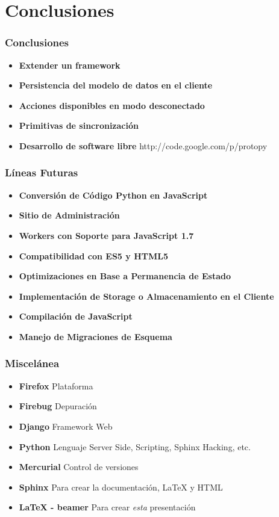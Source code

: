 \documentclass{beamer}
\begin{document}
\section{Conclusiones}
\begin{frame}
    \frametitle{Conclusiones}
    \begin{itemize}
        \item {\bf Extender un framework}
        \item {\bf Persistencia del modelo de datos en el cliente}
        \item {\bf Acciones disponibles en modo desconectado}
        \item {\bf Primitivas de sincronización}
        \item {\bf Desarrollo de software libre} http://code.google.com/p/protopy
    \end{itemize}
\end{frame}

\begin{frame}
    \frametitle{Líneas Futuras}
    \begin{itemize}
        \item{\bf Conversión de Código Python en JavaScript}
        \item{\bf Sitio de Administración}
        \item{\bf Workers con Soporte para JavaScript 1.7}
        \item{\bf Compatibilidad con ES5 y HTML5}
        \item{\bf Optimizaciones en Base a Permanencia de Estado}
        \item{\bf Implementación de Storage o Almacenamiento en el Cliente}
        \item{\bf Compilación de JavaScript}
        \item {\bf Manejo de Migraciones de Esquema}
    \end{itemize}
\end{frame}

\begin{frame}
    \frametitle{Miscelánea}
    \begin{itemize}
        \item {\bf Firefox} Plataforma
        \item {\bf Firebug} Depuración
        \item {\bf Django} Framework Web
        \item {\bf Python} Lenguaje Server Side, Scripting, Sphinx Hacking, etc.
        \item {\bf Mercurial} Control de versiones
        \item {\bf Sphinx} Para crear la documentación, \LaTeX{} y HTML
        \item {\bf \LaTeX{} - beamer} Para crear {\it esta} presentación
    \end{itemize}
\end{frame}
\end{document}
